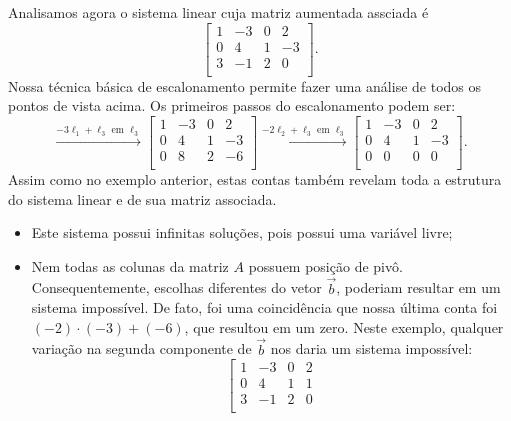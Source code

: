 \begin{ex}
	Analisamos agora o sistema linear cuja matriz aumentada assciada é
	\begin{equation}
	\left[
	\begin{array}{ccc|c}
	1 & -3 & 0 & 2 \\
	0 &  4 & 1 & -3 \\
	3 & -1 & 2 & 0 \\
	\end{array}
	\right].
	\end{equation} Nossa técnica básica de escalonamento permite fazer uma análise de todos os pontos de vista acima. Os primeiros passos do escalonamento podem ser:
	\begin{equation}
	\xrightarrow{-3\ell_1 + \ell_3 \text{ em } \ell_3}
	\left[
	\begin{array}{ccc|c}
	1 & -3 & 0 & 2 \\
	0 &  4 & 1 & -3 \\
	0 &  8 & 2 & -6 \\
	\end{array}
	\right] \xrightarrow{-2\ell_2 + \ell_3 \text{ em } \ell_3}
	\left[
	\begin{array}{ccc|c}
	1 & -3 & 0 & 2 \\
	0 &  4 & 1 & -3 \\
	0 &  0 & 0 & 0 \\
	\end{array}
	\right].
	\end{equation} Assim como no exemplo anterior, estas contas também revelam toda a estrutura do sistema linear e de sua matriz associada.
	\begin{itemize}
		\item Este sistema possui infinitas soluções, pois possui uma variável livre;
		\item Nem todas as colunas da matriz $A$ possuem posição de pivô. Consequentemente, escolhas diferentes do vetor $\vec{b}$, poderiam resultar em um sistema impossível. De fato, foi uma coincidência que nossa última conta foi $(-2)\cdot (-3) + (-6)$, que resultou em um zero. Neste exemplo, qualquer variação na segunda componente de $\vec{b}$ nos daria um sistema impossível:
		\begin{equation}
		\left[
		\begin{array}{ccc|c}
		1 & -3 & 0 & 2 \\
		0 &  4 & 1 & 1 \\
		3 & -1 & 2 & 0 \\
		\end{array}

\end{equation}
\end{itemize}
\end{ex}
